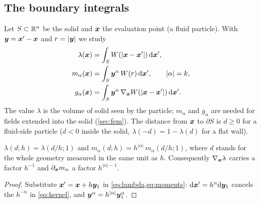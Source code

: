 \subsection{The boundary integrals}
Let $S\subset\mathbb{R}^n$ be the solid and $\bm x$ the evaluation point (a fluid particle). With
$\bm y=\bm x'-\bm x$ and $r=|\bm y|$ we study
\begin{align}
  \lambda(\bm x)&=\int_S W(|\bm x-\bm x'|)\,\mathrm{d}\bm x', \label{eq:lambda}\\
  m_{\alpha}(\bm x)&=\int_S \bm y^\alpha\,W(r)\,\mathrm{d}\bm x',\qquad |\alpha|=k, \label{eq:moments}\\
  g_{\alpha}(\bm x)&=\int_S \bm y^\alpha\,\nabla_{\bm x}W(|\bm x-\bm x'|)\,\mathrm{d}\bm x'. \label{eq:galpha}
\end{align}
The value $\lambda$ is the volume of solid seen by the particle; $m_\alpha$ and $g_\alpha$ are needed
for fields extended into the solid (\cref{sec:fem}). The distance from $\bm x$ to $\partial S$ is $d\ge0$
for a fluid-side particle ($d<0$ inside the solid, $\lambda(-d)=1-\lambda(d)$ for a flat wall).

\begin{lemma}[Scaling]\label{lem:scaling}
$\lambda(d;h)=\lambda(d/h;1)$ and $m_\alpha(d;h)=h^{|\alpha|}\,m_\alpha(d/h;1)$, where $d$ stands for the whole
geometry measured in the same unit as $h$. Consequently $\nabla_{\bm x}\lambda$ carries a factor $h^{-1}$ and
$\partial_{\bm x}m_\alpha$ a factor $h^{|\alpha|-1}$.
\end{lemma}
\begin{proof}
Substitute $\bm x'=\bm x+h\bm y_1$ in \cref{eq:lambda,eq:moments}: $\mathrm{d}\bm x'=h^n\mathrm{d}\bm y_1$ cancels the $h^{-n}$ in
\cref{eq:kernel}, and $\bm y^\alpha=h^{|\alpha|}\bm y_1^\alpha$.
\end{proof}

